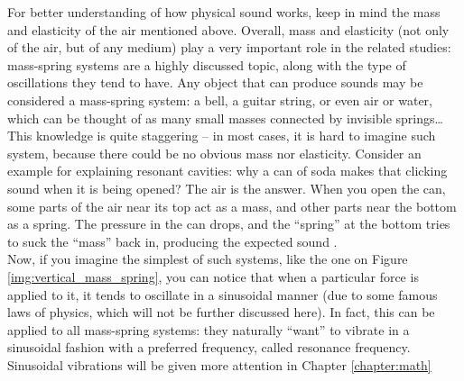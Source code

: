 For better understanding of how physical sound works, keep in mind the mass and elasticity of the air mentioned above. Overall, mass and elasticity (not only of the air, but of any medium) play a very important role in the related studies: mass-spring systems are a highly discussed topic, along with the type of oscillations they tend to have. Any object that can produce sounds may be considered a mass-spring system: a bell, a guitar string, or even air or water, which can be thought of as many small masses connected by invisible springs\dots{} This knowledge is quite staggering -- in most cases, it is hard to imagine such system, because there could be no obvious mass nor elasticity. Consider an example for explaining resonant cavities: why a can of soda makes that clicking sound when it is being opened? The air is the answer. When you open the can, some parts of the air near its top act as a mass, and other parts near the bottom as a spring. The pressure in the can drops, and the “spring” at the bottom tries to suck the “mass” back in, producing the expected sound \cite{Schnupp2011}.\\

Now, if you imagine the simplest of such systems, like the one on Figure \ref{img:vertical_mass_spring}, you can notice that when a particular force is applied to it, it tends to oscillate in a sinusoidal manner (due to some famous laws of physics, which will not be further discussed here). In fact, this can be applied to all mass-spring systems: they naturally “want” to vibrate in a sinusoidal fashion with a preferred frequency, called resonance frequency. Sinusoidal vibrations will be given more attention in Chapter \ref{chapter:math}\\


